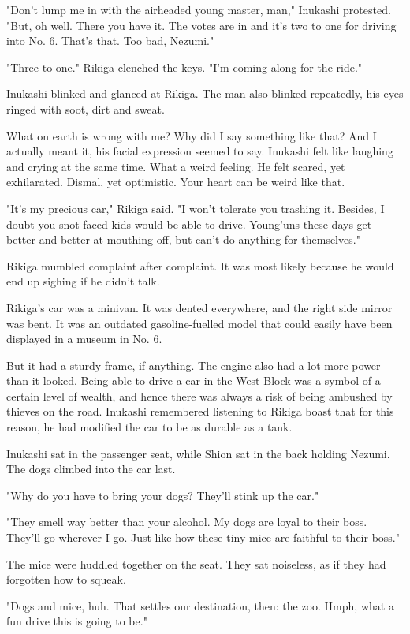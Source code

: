 "Don't lump me in with the airheaded young master, man," Inukashi
protested. "But, oh well. There you have it. The votes are in and it's
two to one for driving into No. 6. That's that. Too bad, Nezumi."

"Three to one." Rikiga clenched the keys. "I'm coming along for the
ride."

Inukashi blinked and glanced at Rikiga. The man also blinked repeatedly,
his eyes ringed with soot, dirt and sweat.

What on earth is wrong with me? Why did I say something like that? And I
actually meant it, his facial expression seemed to say. Inukashi felt
like laughing and crying at the same time. What a weird feeling. He felt
scared, yet exhilarated. Dismal, yet optimistic. Your heart can be weird
like that.

"It's my precious car," Rikiga said. "I won't tolerate you trashing it.
Besides, I doubt you snot-faced kids would be able to drive. Young'uns
these days get better and better at mouthing off, but can't do anything
for themselves."

Rikiga mumbled complaint after complaint. It was most likely because he
would end up sighing if he didn't talk.

Rikiga's car was a minivan. It was dented everywhere, and the right side
mirror was bent. It was an outdated gasoline-fuelled model that could
easily have been displayed in a museum in No. 6.

But it had a sturdy frame, if anything. The engine also had a lot more
power than it looked. Being able to drive a car in the West Block was a
symbol of a certain level of wealth, and hence there was always a risk
of being ambushed by thieves on the road. Inukashi remembered listening
to Rikiga boast that for this reason, he had modified the car to be as
durable as a tank.

Inukashi sat in the passenger seat, while Shion sat in the back holding
Nezumi. The dogs climbed into the car last.

"Why do you have to bring your dogs? They'll stink up the car."

"They smell way better than your alcohol. My dogs are loyal to their
boss. They'll go wherever I go. Just like how these tiny mice are
faithful to their boss."

The mice were huddled together on the seat. They sat noiseless, as if
they had forgotten how to squeak.

"Dogs and mice, huh. That settles our destination, then: the zoo. Hmph,
what a fun drive this is going to be."

